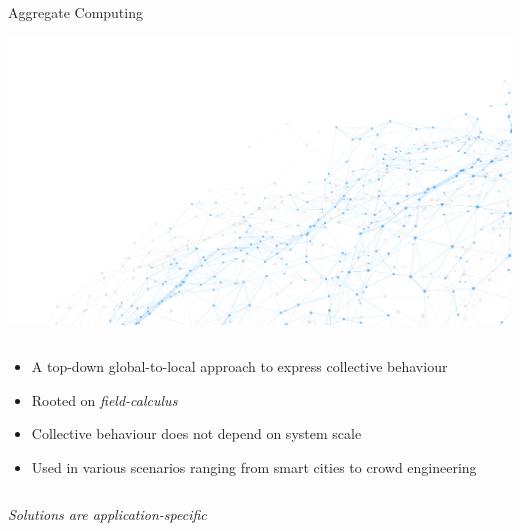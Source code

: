 
\begin{frame}{Aggregate Computing~\cite{DBLP:journals/computer/BealPV15}}
  \begin{backgroundblock} 
    \includegraphics[width=\paperwidth]{img/aggregate-computing.jpg} 
  \end{backgroundblock}
  \begin{columns}[onlytextwidth, t]
    \begin{column}{0.657\textwidth}    
      \begin{cardTiny}
        \begin{itemize}
          \item <1-> A top-down global-to-local approach to express collective behaviour
          \item <2-> Rooted on \textit{field-calculus}~\cite{DBLP:conf/coordination/AudritoBDV18}
          \item <3-> Collective behaviour does not depend on system scale
          \item <4-> Used in various scenarios ranging from smart cities to crowd engineering~\cite{DBLP:conf/coordination/CasadeiPVN19}
        \end{itemize}
      \end{cardTiny}
    \end{column}
    \begin{column}{0.335\textwidth}
    \end{column}
  \end{columns}
  \centering
    \pause[5]
    \begin{cardRed}
      \textit{Solutions are application-specific}
    \end{cardRed}
    

\end{frame}
